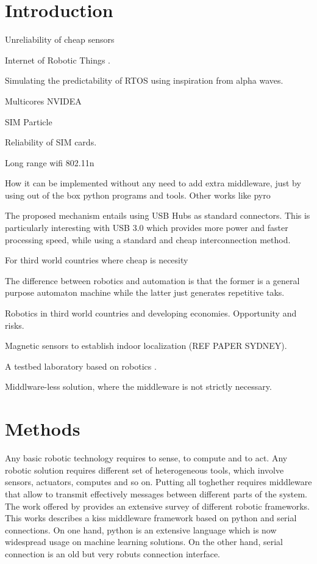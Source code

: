\section{Introduction}
\label{intro}
Unreliability of cheap sensors


Internet of Robotic Things \cite{Simoens2018}.

Simulating the predictability of RTOS using inspiration from alpha waves.

Multicores NVIDEA 

SIM Particle

Reliability of SIM cards.

Long range wifi 802.11n

How it can be implemented without any need to add extra middleware, just by using out of the box python programs and tools.  Other works like pyro

The proposed mechanism entails using USB Hubs as standard connectors.  This is particularly interesting with USB 3.0 which provides more power and faster processing speed, while using a standard and cheap interconnection method.

For third world countries where cheap is necesity 

The difference between robotics and automation is that the former is a general purpose automaton machine while the latter just generates repetitive taks.

Robotics in third world countries and developing economies.  Opportunity and risks.

Magnetic sensors to establish indoor localization (REF PAPER SYDNEY).

A testbed laboratory based on robotics \cite{Hamblen2013}.


Middlware-less solution, where the middleware is not strictly necessary.
\section{Methods}
\label{sec:1}
Any basic robotic technology requires to sense, to compute and to act.  
Any robotic solution requires different set of heterogeneous tools, which involve sensors, actuators, computes and so on.  Putting all toghether requires middleware that allow to transmit effectively messages between different parts of the system.
The work offered by \cite{Elkady2012} provides an extensive survey of different robotic frameworks.  This works describes a kiss middleware framework based on python and serial connections.   On one hand, python is an extensive language which is now widespread usage on machine learning solutions.  On the other hand, serial connection is an old but very robuts connection interface.

